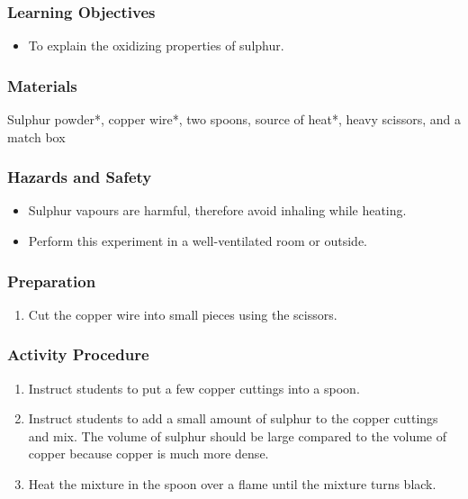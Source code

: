 \subsubsection*{Learning Objectives}
\begin{itemize}
\item{To explain the oxidizing properties of sulphur.}
\end{itemize}

\subsubsection*{Materials}
Sulphur powder*, copper wire*, two spoons, source of heat*, heavy scissors, and a match box

\subsubsection*{Hazards and Safety}
\begin{itemize}
\item{Sulphur vapours are harmful, therefore avoid inhaling while heating.}
\item{Perform this experiment in a well-ventilated room or outside.}
\end{itemize}

\subsubsection*{Preparation}
\begin{enumerate}
\item{Cut the copper wire into small pieces using the scissors.}
\end{enumerate}

\subsubsection*{Activity Procedure}
\begin{enumerate}
\item{Instruct students to put a few copper cuttings into a spoon.}
\item{Instruct students to add a small amount of sulphur to the copper cuttings and mix. The volume of sulphur should be large compared to the volume of copper because copper is much more dense.}
\item{Heat the mixture in the spoon over a flame until the mixture turns black.}
\end{enumerate}

